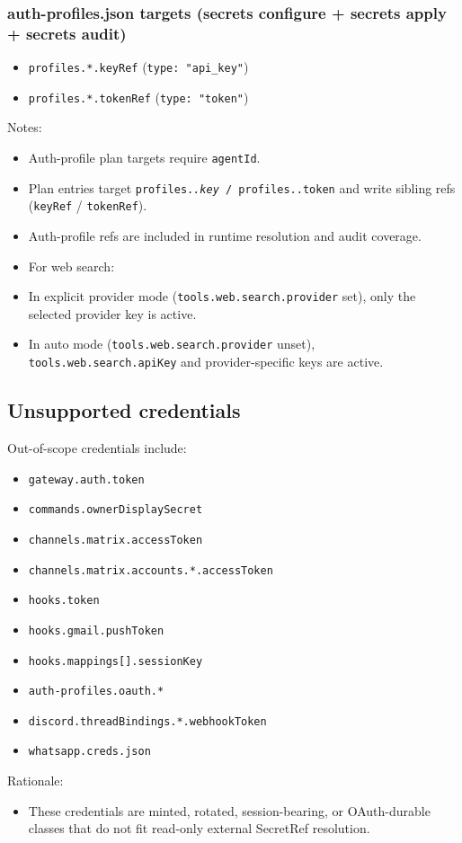 \subsubsection{auth-profiles.json targets (secrets configure + secrets apply + secrets audit)}


\begin{itemize}
  \item \texttt{profiles.*.keyRef} (\texttt{type: "api\_key"})
  \item \texttt{profiles.*.tokenRef} (\texttt{type: "token"})
\end{itemize}


Notes:

\begin{itemize}
  \item Auth-profile plan targets require \texttt{agentId}.
  \item Plan entries target \texttt{profiles.\textit{.key} / \texttt{profiles.}.token} and write sibling refs (\texttt{keyRef} / \texttt{tokenRef}).
  \item Auth-profile refs are included in runtime resolution and audit coverage.
  \item For web search:
  \item In explicit provider mode (\texttt{tools.web.search.provider} set), only the selected provider key is active.
  \item In auto mode (\texttt{tools.web.search.provider} unset), \texttt{tools.web.search.apiKey} and provider-specific keys are active.
\end{itemize}


\subsection{Unsupported credentials}


Out-of-scope credentials include:


\begin{itemize}
  \item \texttt{gateway.auth.token}
  \item \texttt{commands.ownerDisplaySecret}
  \item \texttt{channels.matrix.accessToken}
  \item \texttt{channels.matrix.accounts.*.accessToken}
  \item \texttt{hooks.token}
  \item \texttt{hooks.gmail.pushToken}
  \item \texttt{hooks.mappings[].sessionKey}
  \item \texttt{auth-profiles.oauth.*}
  \item \texttt{discord.threadBindings.*.webhookToken}
  \item \texttt{whatsapp.creds.json}
\end{itemize}


Rationale:

\begin{itemize}
  \item These credentials are minted, rotated, session-bearing, or OAuth-durable classes that do not fit read-only external SecretRef resolution.
\end{itemize}



\clearpage

